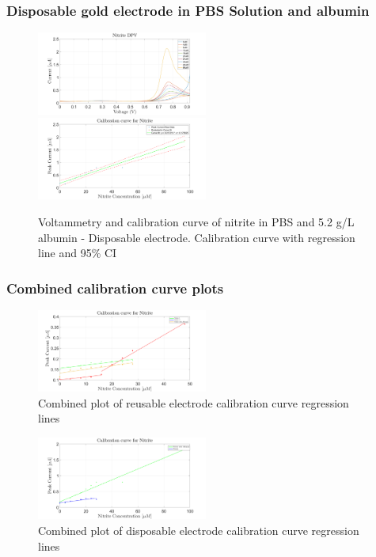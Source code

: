 \subsubsection{Disposable gold electrode in PBS Solution and albumin}
\begin{figure}[H]
    \centering
    \includegraphics[width = 0.5\textwidth]{img/disp albumin.png} \includegraphics[width = 0.5\textwidth]{img/disp albumin calibration.png}
    \caption{Voltammetry and calibration curve of nitrite in PBS and 5.2 g/L albumin - Disposable electrode. Calibration curve with regression line and 95\% CI}
    \label{fig:nitrite_result_4}
\end{figure}

\subsubsection{Combined calibration curve plots}
\begin{figure}[H]
    \centering
    \includegraphics[width = 0.5\textwidth]{img/combinedreus new.png}
    \caption{Combined plot of reusable electrode calibration curve regression lines}
    \label{fig:nitrite_calibration_1}
\end{figure}

\begin{figure}[H]
    \centering
    \includegraphics[width = 0.5\textwidth]{img/combined disp.png}
    \caption{Combined plot of disposable electrode calibration curve regression lines}
    \label{fig:nitrite_calibration_2}
\end{figure}

